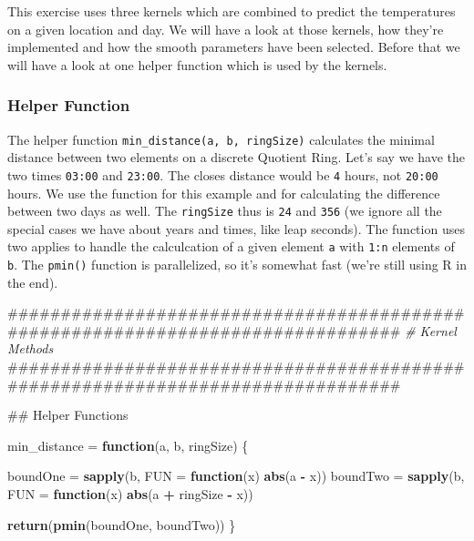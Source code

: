 \documentclass[]{article}
\newenvironment{Shaded}{\begin{snugshade}}{\end{snugshade}}
\newcommand{\KeywordTok}[1]{\textcolor[rgb]{0.13,0.29,0.53}{\textbf{#1}}}
\newcommand{\DataTypeTok}[1]{\textcolor[rgb]{0.13,0.29,0.53}{#1}}
\newcommand{\StringTok}[1]{\textcolor[rgb]{0.31,0.60,0.02}{#1}}
\newcommand{\CommentTok}[1]{\textcolor[rgb]{0.56,0.35,0.01}{\textit{#1}}}
\newcommand{\ControlFlowTok}[1]{\textcolor[rgb]{0.13,0.29,0.53}{\textbf{#1}}}
\newcommand{\OperatorTok}[1]{\textcolor[rgb]{0.81,0.36,0.00}{\textbf{#1}}}
\newcommand{\NormalTok}[1]{#1}
\begin{document}
This exercise uses three kernels which are combined to predict the
temperatures on a given location and day. We will have a look at those
kernels, how they're implemented and how the smooth parameters have been
selected. Before that we will have a look at one helper function which
is used by the kernels.

\subsubsection{Helper Function}\label{helper-function}

The helper function \texttt{min\_distance(a,\ b,\ ringSize)} calculates
the minimal distance between two elements on a discrete Quotient Ring.
Let's say we have the two times \texttt{03:00} and \texttt{23:00}. The
closes distance would be \texttt{4} hours, not \texttt{20:00} hours. We
use the function for this example and for calculating the difference
between two days as well. The \texttt{ringSize} thus is \texttt{24} and
\texttt{356} (we ignore all the special cases we have about years and
times, like leap seconds). The function uses two applies to handle the
calculcation of a given element \texttt{a} with \texttt{1:n} elements of
\texttt{b}. The \texttt{pmin()} function is parallelized, so it's
somewhat fast (we're still using R in the end).

\begin{Shaded}
\begin{Highlighting}[]
\NormalTok{################################################################################}
\CommentTok{# Kernel Methods}
\NormalTok{################################################################################}

\NormalTok{## Helper Functions}

\NormalTok{min_distance =}\StringTok{ }\ControlFlowTok{function}\NormalTok{(a, b, ringSize) \{}
  
\NormalTok{  boundOne =}\StringTok{ }\KeywordTok{sapply}\NormalTok{(b, }\DataTypeTok{FUN =} \ControlFlowTok{function}\NormalTok{(x) }\KeywordTok{abs}\NormalTok{(a }\OperatorTok{-}\StringTok{ }\NormalTok{x))}
\NormalTok{  boundTwo =}\StringTok{ }\KeywordTok{sapply}\NormalTok{(b, }\DataTypeTok{FUN =} \ControlFlowTok{function}\NormalTok{(x) }\KeywordTok{abs}\NormalTok{(a }\OperatorTok{+}\StringTok{ }\NormalTok{ringSize }\OperatorTok{-}\StringTok{ }\NormalTok{x))}
    
  \KeywordTok{return}\NormalTok{(}\KeywordTok{pmin}\NormalTok{(boundOne, boundTwo))}
\NormalTok{\}}
\end{Highlighting}
\end{Shaded}
\end{document}
